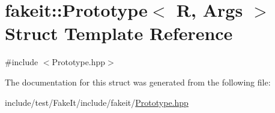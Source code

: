 \hypertarget{structfakeit_1_1Prototype}{}\section{fakeit\+::Prototype$<$ R, Args $>$ Struct Template Reference}
\label{structfakeit_1_1Prototype}


{\ttfamily \#include $<$Prototype.\+hpp$>$}



The documentation for this struct was generated from the following file\+:\begin{DoxyCompactItemize}
\item 
include/test/\+Fake\+It/include/fakeit/\mbox{\hyperlink{Prototype_8hpp}{Prototype.\+hpp}}\end{DoxyCompactItemize}
